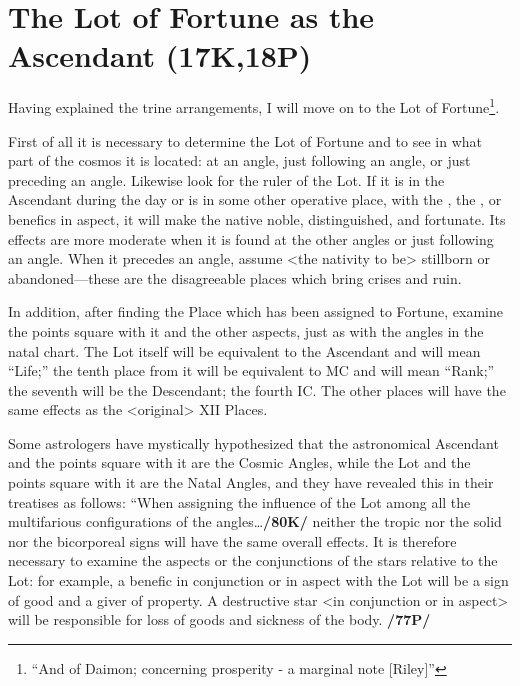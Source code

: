 \section{The Lot of Fortune as the Ascendant (17K,18P)}
Having explained the trine arrangements, I will move on to the Lot of Fortune\footnote{``And of Daimon; concerning prosperity - a marginal note [Riley]''}. 

First of all it is necessary to determine the Lot of Fortune and to see in what part of the cosmos it is located: at an angle, just following an angle, or just preceding an angle. Likewise look for the ruler of the Lot. If it is in the Ascendant during the day or is in some other operative place, with the \Sun, the \Moon, or benefics in aspect, it will make the native noble, distinguished, and fortunate. Its effects are more moderate when it is found at the other angles or just following an angle.  \mndl When it precedes an angle, assume <the nativity to be> stillborn or abandoned—these are the disagreeable places which bring crises and ruin.

In addition, after finding the Place which has been assigned to Fortune, examine the points square with it and the other aspects, just as with the angles in the natal chart. The Lot itself will be equivalent to the Ascendant and will mean “Life;” the tenth place from it will be equivalent to MC and will mean “Rank;” the seventh will be the Descendant; the fourth IC. The other places will have the same effects as the <original> XII Places. 

Some astrologers have mystically hypothesized that the astronomical Ascendant and the points square with it are the Cosmic Angles, while the Lot and the points square with it are the Natal Angles, and they have revealed this in their treatises as follows: “When assigning the influence of the
Lot among all the multifarious configurations of the angles\ldots \textbf{/80K/} neither the tropic nor the solid nor the bicorporeal signs will have the same overall effects. It is therefore necessary to examine the aspects or the
conjunctions of the stars relative to the Lot: for example, a benefic in conjunction or in aspect with the Lot will be a sign of good and a giver of property. A destructive star <in conjunction or in aspect> will be responsible for loss of goods and sickness of the body. \textbf{/77P/}

\newpage